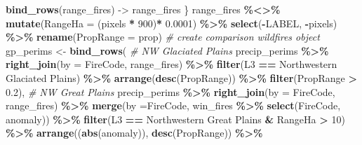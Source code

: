 \documentclass[
]{article}
\newenvironment{Shaded}{\begin{snugshade}}{\end{snugshade}}
\newcommand{\AttributeTok}[1]{\textcolor[rgb]{0.13,0.29,0.53}{#1}}
\newcommand{\CommentTok}[1]{\textcolor[rgb]{0.56,0.35,0.01}{\textit{#1}}}
\newcommand{\DecValTok}[1]{\textcolor[rgb]{0.00,0.00,0.81}{#1}}
\newcommand{\FloatTok}[1]{\textcolor[rgb]{0.00,0.00,0.81}{#1}}
\newcommand{\FunctionTok}[1]{\textcolor[rgb]{0.13,0.29,0.53}{\textbf{#1}}}
\newcommand{\NormalTok}[1]{#1}
\newcommand{\OtherTok}[1]{\textcolor[rgb]{0.56,0.35,0.01}{#1}}
\newcommand{\SpecialCharTok}[1]{\textcolor[rgb]{0.81,0.36,0.00}{\textbf{#1}}}
\newcommand{\StringTok}[1]{\textcolor[rgb]{0.31,0.60,0.02}{#1}}
\begin{document}
\begin{Shaded}
\begin{Highlighting}[]
      \FunctionTok{bind\_rows}\NormalTok{(range\_fires) }\OtherTok{{-}\textgreater{}}\NormalTok{ range\_fires \}}
\NormalTok{  range\_fires }\SpecialCharTok{\%\textless{}\textgreater{}\%}
    \FunctionTok{mutate}\NormalTok{(}\AttributeTok{RangeHa =}\NormalTok{ (pixels }\SpecialCharTok{*} \DecValTok{900}\NormalTok{)}\SpecialCharTok{*} \FloatTok{0.0001}\NormalTok{) }\SpecialCharTok{\%\textgreater{}\%}
    \FunctionTok{select}\NormalTok{(}\SpecialCharTok{{-}}\NormalTok{LABEL, }\SpecialCharTok{{-}}\NormalTok{pixels)  }\SpecialCharTok{\%\textgreater{}\%}
    \FunctionTok{rename}\NormalTok{(}\AttributeTok{PropRange =}\NormalTok{ prop) }
\CommentTok{\# create comparison wildfires object }
\NormalTok{  gp\_perims }\OtherTok{\textless{}{-}} 
    \FunctionTok{bind\_rows}\NormalTok{(}
    \CommentTok{\# NW Glaciated Plains}
\NormalTok{      precip\_perims }\SpecialCharTok{\%\textgreater{}\%} 
        \FunctionTok{right\_join}\NormalTok{(}\AttributeTok{by =} \StringTok{\textquotesingle{}FireCode\textquotesingle{}}\NormalTok{, }
\NormalTok{                   range\_fires) }\SpecialCharTok{\%\textgreater{}\%} 
        \FunctionTok{filter}\NormalTok{(L3 }\SpecialCharTok{==} \StringTok{\textquotesingle{}Northwestern Glaciated Plains\textquotesingle{}}\NormalTok{) }\SpecialCharTok{\%\textgreater{}\%}
        \FunctionTok{arrange}\NormalTok{(}\FunctionTok{desc}\NormalTok{(PropRange)) }\SpecialCharTok{\%\textgreater{}\%}
        \FunctionTok{filter}\NormalTok{(PropRange }\SpecialCharTok{\textgreater{}} \FloatTok{0.2}\NormalTok{), }
    \CommentTok{\# NW Great Plains }
\NormalTok{      precip\_perims }\SpecialCharTok{\%\textgreater{}\%} 
        \FunctionTok{right\_join}\NormalTok{(}\AttributeTok{by =} \StringTok{\textquotesingle{}FireCode\textquotesingle{}}\NormalTok{, }
\NormalTok{                   range\_fires) }\SpecialCharTok{\%\textgreater{}\%} 
        \FunctionTok{merge}\NormalTok{(}\AttributeTok{by =}\StringTok{\textquotesingle{}FireCode\textquotesingle{}}\NormalTok{, }
\NormalTok{              win\_fires }\SpecialCharTok{\%\textgreater{}\%} \FunctionTok{select}\NormalTok{(FireCode, anomaly)) }\SpecialCharTok{\%\textgreater{}\%} 
        \FunctionTok{filter}\NormalTok{(L3 }\SpecialCharTok{==} \StringTok{\textquotesingle{}Northwestern Great Plains\textquotesingle{}} \SpecialCharTok{\&}
\NormalTok{               RangeHa }\SpecialCharTok{\textgreater{}} \DecValTok{10}\NormalTok{) }\SpecialCharTok{\%\textgreater{}\%}
        \FunctionTok{arrange}\NormalTok{((}\FunctionTok{abs}\NormalTok{(anomaly)), }\FunctionTok{desc}\NormalTok{(PropRange)) }\SpecialCharTok{\%\textgreater{}\%}

\end{Highlighting}
\end{Shaded}
\end{document}
